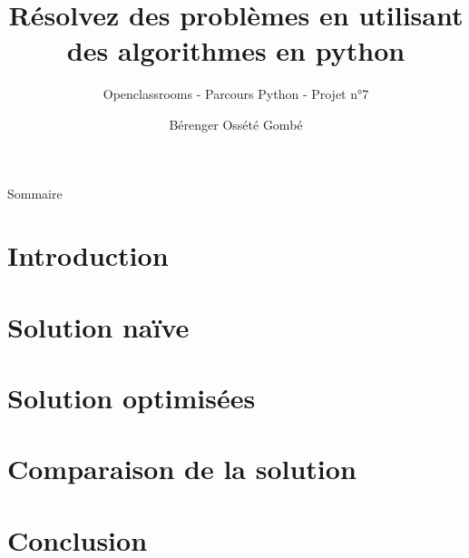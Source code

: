 \documentclass{beamer}
\title{Résolvez des problèmes en utilisant des algorithmes en python}
\subtitle{Openclassrooms - Parcours Python - Projet n°7}
\author{Bérenger Ossété Gombé}
\begin{document}
\begin{frame}
   \titlepage
\end{frame}

\begin{frame}{Sommaire}
   \tableofcontents
\end{frame}

\section{Introduction}


\section{Solution naïve}


\section{Solution optimisées}


\section{Comparaison de la solution}


\section{Conclusion}

\end{document}
